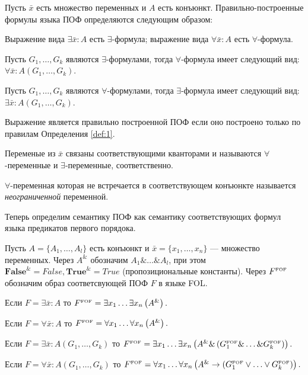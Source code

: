 \begin{definition}\label{def:1}
Пусть $\bar{x}$ есть множество переменных и $A$ есть конъюнкт. Правильно-построенные формулы языка ПОФ определяются следующим образом: 

Выражение вида $\exists \bar{x}\colon A$ есть $\exists$-формула; выражение вида $\forall \bar{x}\colon A$ есть $\forall$-формула.

Пусть $G_1,\ldots,G_k$ являются $\exists$-формулами, тогда $\forall$-формула имеет следующий вид: $\forall \bar{x}\colon A\left(G_1,\ldots,G_k\right)$. 

Пусть $G_1,\ldots,G_k$ являются $\forall$-формулами, тогда $\exists$-формула имеет следующий вид: $\exists \bar{x}\colon A\left(G_1,\ldots,G_k\right)$. 

\end{definition}

Выражение является правильно построенной ПОФ если оно построено только по правилам Определения \ref{def:1}.

Переменые из $\bar{x}$ связаны соответствующими кванторами и называются $\forall$-переменные и $\exists$-переменные, соответственно. 

$\forall$-переменная которая не встречается в соответствующем конъюнкте называется {\em неограниченной} переменной. 

Теперь определим семантику ПОФ как семантику соответствующих формул языка предикатов первого порядока.

\begin{definition}\label{def:semantic}
Пусть $A = \{A_1,\ldots,A_l\}$ есть конъюнкт и $\bar{x} = \{x_1,\ldots,x_n\}$ --- множество переменных. Через $A^{\&}$ обозначим $A_1 \&\ldots\&A_l$, при этом $\boldsymbol{False}^{\&}= False, \boldsymbol{True}^{\&}=True$ (пропозициональные константы). Через $F^{\text{\tiny{FOF}}}$ обозначим образ соответсвующей ПОФ $F$ в языке FOL.

Если $F= \exists \bar{x}\colon A$ то $F^{\text{\tiny{FOF}}} = \exists x_1 \ldots \exists x_n \left(A^{\&}\right).$

Если $F = \forall \bar{x}\colon A$ то $F^{\text{\tiny{FOF}}} = \forall x_1 \ldots \forall x_n \left(A^{\&}\right).$

Если $F = \exists \bar{x}\colon A\left(G_1,\ldots,G_k\right)$ то $F^{\text{\tiny{FOF}}} = \exists x_1 \ldots \exists x_n  \left(A^{\&} \& \left(G_{1}^{\text{\tiny{FOF}}} \& \ldots \& G_{k}^{\text{\tiny{FOF}}}\right)\right).$

Если $F = \forall \bar{x}\colon A\left(G_1,\ldots,G_k\right)$ то $F^{\text{\tiny{FOF}}} = \forall x_1 \ldots \forall x_n \left(A^{\&}\rightarrow \left(G_{1}^{\text{\tiny{FOF}}} \vee\ldots\vee G_{k}^{\text{\tiny{FOF}}}\right)\right).$

\end{definition}     

